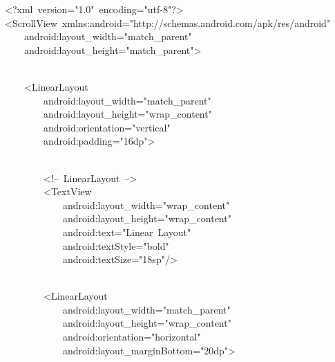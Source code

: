 {\ttfamily\small \textless{}?xml\ version="1.0"\ encoding="utf-8"?\textgreater{}} \\
{\ttfamily\small \textless{}ScrollView\ xmlns:android="http://schemas.android.com/apk/res/android"} \\
{\ttfamily\small \ \ \ \ android:layout\_width="match\_parent"} \\
{\ttfamily\small \ \ \ \ android:layout\_height="match\_parent"\textgreater{}} \\
\strut \\
{\ttfamily\small \ \ \ \ \textless{}LinearLayout} \\
{\ttfamily\small \ \ \ \ \ \ \ \ android:layout\_width="match\_parent"} \\
{\ttfamily\small \ \ \ \ \ \ \ \ android:layout\_height="wrap\_content"} \\
{\ttfamily\small \ \ \ \ \ \ \ \ android:orientation="vertical"} \\
{\ttfamily\small \ \ \ \ \ \ \ \ android:padding="16dp"\textgreater{}} \\
\strut \\
{\ttfamily\small \ \ \ \ \ \ \ \ \textless{}!--\ LinearLayout\ --\textgreater{}} \\
{\ttfamily\small \ \ \ \ \ \ \ \ \textless{}TextView} \\
{\ttfamily\small \ \ \ \ \ \ \ \ \ \ \ \ android:layout\_width="wrap\_content"} \\
{\ttfamily\small \ \ \ \ \ \ \ \ \ \ \ \ android:layout\_height="wrap\_content"} \\
{\ttfamily\small \ \ \ \ \ \ \ \ \ \ \ \ android:text="Linear\ Layout"} \\
{\ttfamily\small \ \ \ \ \ \ \ \ \ \ \ \ android:textStyle="bold"} \\
{\ttfamily\small \ \ \ \ \ \ \ \ \ \ \ \ android:textSize="18sp"/\textgreater{}} \\
\strut \\
{\ttfamily\small \ \ \ \ \ \ \ \ \textless{}LinearLayout} \\
{\ttfamily\small \ \ \ \ \ \ \ \ \ \ \ \ android:layout\_width="match\_parent"} \\
{\ttfamily\small \ \ \ \ \ \ \ \ \ \ \ \ android:layout\_height="wrap\_content"} \\
{\ttfamily\small \ \ \ \ \ \ \ \ \ \ \ \ android:orientation="horizontal"} \\
{\ttfamily\small \ \ \ \ \ \ \ \ \ \ \ \ android:layout\_marginBottom="20dp"\textgreater{}} \\
